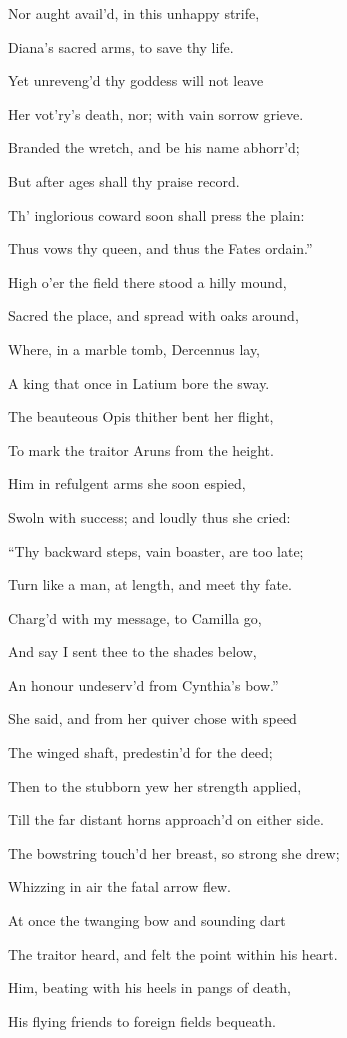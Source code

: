 Nor aught avail’d, in this unhappy strife,

Diana’s sacred arms, to save thy life.

Yet unreveng’d thy goddess will not leave

Her vot’ry’s death, nor; with vain sorrow grieve.

Branded the wretch, and be his name abhorr’d;

But after ages shall thy praise record.

Th’ inglorious coward soon shall press the plain:

Thus vows thy queen, and thus the Fates ordain.”

High o’er the field there stood a hilly mound,

Sacred the place, and spread with oaks around,

Where, in a marble tomb, Dercennus lay,

A king that once in Latium bore the sway.

The beauteous Opis thither bent her flight,

To mark the traitor Aruns from the height.

Him in refulgent arms she soon espied,

Swoln with success; and loudly thus she cried:

“Thy backward steps, vain boaster, are too late;

Turn like a man, at length, and meet thy fate.

Charg’d with my message, to Camilla go,

And say I sent thee to the shades below,

An honour undeserv’d from Cynthia’s bow.”

She said, and from her quiver chose with speed

The winged shaft, predestin’d for the deed;

Then to the stubborn yew her strength applied,

Till the far distant horns approach’d on either side.

The bowstring touch’d her breast, so strong she drew;

Whizzing in air the fatal arrow flew.

At once the twanging bow and sounding dart

The traitor heard, and felt the point within his heart.

Him, beating with his heels in pangs of death,

His flying friends to foreign fields bequeath.


